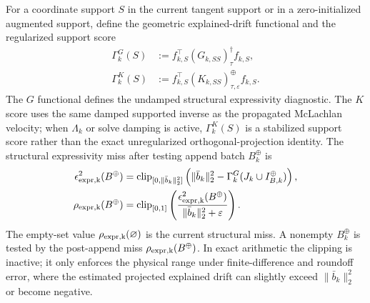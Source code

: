 \documentclass[
  reprint,
  amsmath,
  amssymb,
  aps,
  pra,
  nofootinbib,
  superscriptaddress,
  floatfix
]{revtex4-2}
\newcommand{\eps}{\varepsilon}
\begin{document}
For a coordinate support $S$ in the current tangent support or in a zero-initialized augmented support, define the geometric explained-drift functional and the regularized support score
\begin{equation}
\begin{aligned}
\Gamma_k^{G}(S)
&:=f_{k,S}^{\top}(G_{k,SS})_{\tau}^{\dagger}f_{k,S},\\
\Gamma_k^{K}(S)
&:=f_{k,S}^{\top}(K_{k,SS})_{\tau,\eps}^{\oplus}f_{k,S}.
\end{aligned}
\label{eq:explained_drift_functionals}
\end{equation}
The $G$ functional defines the undamped structural expressivity diagnostic.  The $K$ score uses the same damped supported inverse as the propagated McLachlan velocity; when $\Lambda_k$ or solve damping is active, $\Gamma_k^K(S)$ is a stabilized support score rather than the exact unregularized orthogonal-projection identity.  The structural expressivity miss after testing append batch $B_k^{\oplus}$ is
\begin{equation}
\begin{aligned}
\epsilon_{\rm expr,k}^2(B^{\oplus})
&=
\operatorname{clip}_{[0,\|\bar b_k\|_2^2]}
\left(
\|\bar b_k\|_2^2-\Gamma_k^{G}(J_k\cup I_{B,k}^{\oplus})
\right),\\
\rho_{\rm expr,k}(B^{\oplus})
&=
\operatorname{clip}_{[0,1]}
\left(
\frac{\epsilon_{\rm expr,k}^2(B^{\oplus})}{\|\bar b_k\|_2^2+\eps}
\right).
\end{aligned}
\label{eq:expr_miss}
\end{equation}
The empty-set value $\rho_{\rm expr,k}(\varnothing)$ is the current structural miss.  A nonempty $B_k^{\oplus}$ is tested by the post-append miss $\rho_{\rm expr,k}(B^{\oplus})$.  In exact arithmetic the clipping is inactive; it only enforces the physical range under finite-difference and roundoff error, where the estimated projected explained drift can slightly exceed $\|\bar b_k\|_2^2$ or become negative.
\end{document}
